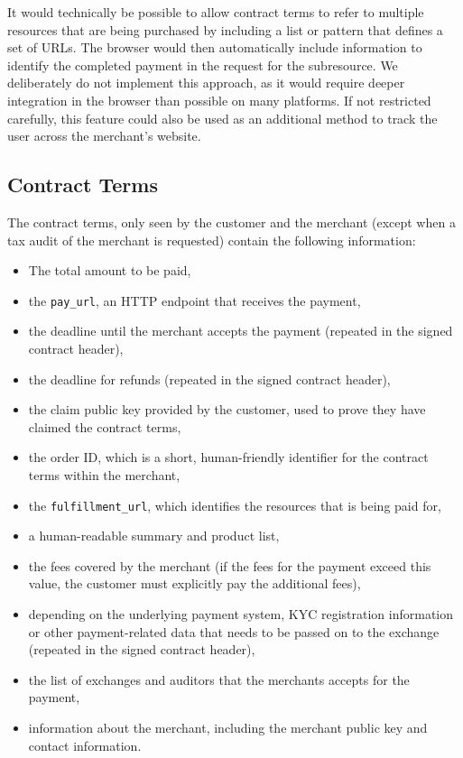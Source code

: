 It would technically be possible to allow contract terms to refer to multiple
resources that are being purchased by including a list or pattern that defines
a set of URLs.  The browser would then automatically include information to
identify the completed payment in the request for the subresource.  We
deliberately do not implement this approach, as it would require deeper
integration in the browser than possible on many platforms.  If not restricted
carefully, this feature could also be used as an additional method to track the
user across the merchant's website.

\subsection{Contract Terms}
The contract terms, only seen by the customer and the merchant (except when a tax audit of the merchant is requested)
contain the following information:
\begin{itemize}
  \item The total amount to be paid,
  \item the \texttt{pay\_url}, an HTTP endpoint that receives the payment,
  \item the deadline until the merchant accepts the payment (repeated in the signed contract header),
  \item the deadline for refunds (repeated in the signed contract header),
  \item the claim public key provided by the customer, used to prove they have claimed the contract terms,
  \item the order ID, which is a short, human-friendly identifier for the contract terms within
    the merchant,
  \item the \texttt{fulfillment\_url}, which identifies the resources that is being paid for,
  \item a human-readable summary and product list,
  \item the fees covered by the merchant (if the fees for the payment exceed this value, the
    customer must explicitly pay the additional fees),
  \item depending on the underlying payment system, KYC registration information
    or other payment-related data that needs to be passed on to the exchange (repeated in the signed contract header),
  \item the list of exchanges and auditors that the merchants accepts for the payment,
  \item information about the merchant, including the merchant public key and contact information.
\end{itemize}


